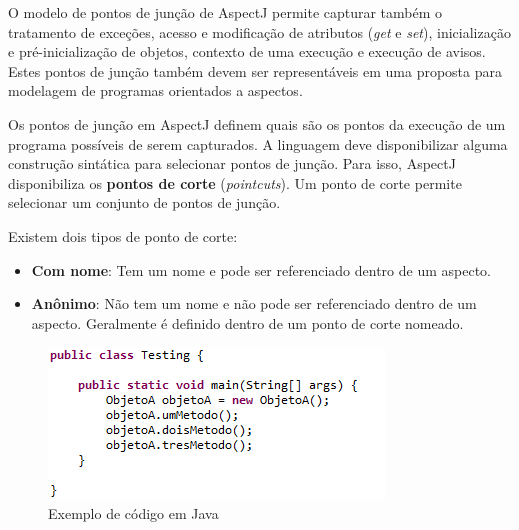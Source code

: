 O modelo de pontos de junção de AspectJ permite capturar também o tratamento de exceções, acesso e modificação de atributos (\textit{get} e
\textit{set}), inicialização e pré-inicialização de objetos, contexto de uma execução e execução de avisos. Estes pontos de junção também devem ser
representáveis em uma proposta para modelagem de programas orientados a aspectos.

Os pontos de junção em AspectJ definem quais são os pontos da execução de um programa possíveis de serem capturados. A linguagem deve disponibilizar
alguma construção sintática para selecionar pontos de junção. Para isso, AspectJ disponibiliza os \textbf{pontos de corte} (\textit{pointcuts}). Um
ponto de corte permite selecionar um conjunto de pontos de junção. 

Existem dois tipos de ponto de corte:

\begin{itemize}
  \item \textbf{Com nome}: Tem um nome e pode ser referenciado dentro de um
  aspecto.
  \item \textbf{Anônimo}: Não tem um nome e não pode ser referenciado dentro de
  um aspecto. Geralmente é definido dentro de um ponto de corte nomeado.
\end{itemize}

\begin{figure}
	\centering
	\includegraphics{img/pointcut_code.png}
	\caption{Exemplo de código em Java}\label{fig:pointcut_code}
\end{figure}

